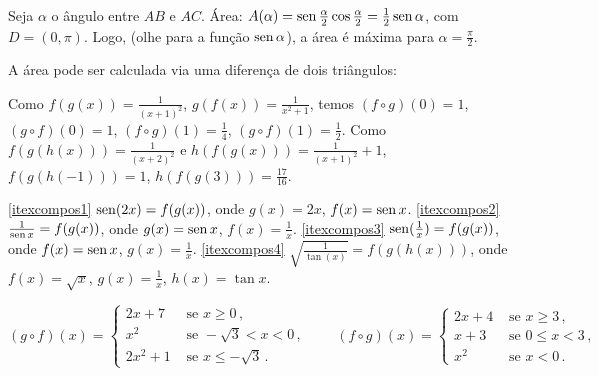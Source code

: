 \begin{Solution}{2.18}
Seja $\alpha$ o ângulo entre $AB$ e $AC$.
Área: $A(\alpha)=\operatorname{sen} \tfrac{\alpha}{2}\cos\tfrac{\alpha}{2}=\tfrac12\operatorname{sen} \alpha$, com
$D=(0,\pi)$.
Logo, (olhe para a função $\operatorname{sen} \alpha$), a área é máxima para $\alpha=\tfrac{\pi}{2}$.
\end{Solution}
\begin{Solution}{2.19}
A área pode ser calculada via uma diferença de dois triângulos:
\begin{center}
\begin{bmlimage}\end{bmlimage}
\end{center}
\end{Solution}
\begin{Solution}{2.21}
 Como $f(g(x))=\frac{1}{(x+1)^2}$, $g(f(x))=\frac{1}{x^2+1}$, temos
$(f\circ g)(0)=1$, $(g\circ f)(0)=1$, $(f\circ g)(1)=\frac14$, $(g\circ f)(1)=\frac12$.
Como $f(g(h(x)))=\frac{1}{(x+2)^2}$ e $h(f(g(x)))=\frac{1}{(x+1)^2}+1$,
 $f(g(h(-1)))=1$,
$h(f(g(3)))=\frac{17}{16}$.
\end{Solution}
\begin{Solution}{2.22}
\eqref{itexcompos1} $\operatorname{sen} (2x)=f(g(x))$, onde $g(x)=2x$, $f(x)=\operatorname{sen} x$.
\eqref{itexcompos2} $\frac{1}{\operatorname{sen} x}=f(g(x))$, onde $g(x)=\operatorname{sen} x$, $f(x)=\frac1x$.
\eqref{itexcompos3} $\operatorname{sen}(\frac{1}{x})=f(g(x))$, onde $f(x)=\operatorname{sen} x$, $g(x)=\frac1x$.
\eqref{itexcompos4} $\sqrt{\frac{1}{\tan (x)}}=f(g(h(x)))$, onde $f(x)=\sqrt{x}$,
$g(x)=\frac{1}{x}$, $h(x)=\tan x$.
\end{Solution}
\begin{Solution}{2.23}
$$
(g\circ f)(x)=
\begin{cases}
 2x+7&\text{ se }x\geq 0\,,\\
x^2&\text{ se }-\sqrt{3}<x<0\,,\\
2x^2+1&\text{ se }x\leq -\sqrt{3}\,.
\end{cases}
\quad\quad
(f\circ g)(x)=
\begin{cases}
 2x+4&\text{ se }x\geq 3\,,\\
x+3&\text{ se }0\leq x<3\,,\\
x^2&\text{ se }x<0\,.
\end{cases}
$$
\end{Solution}
